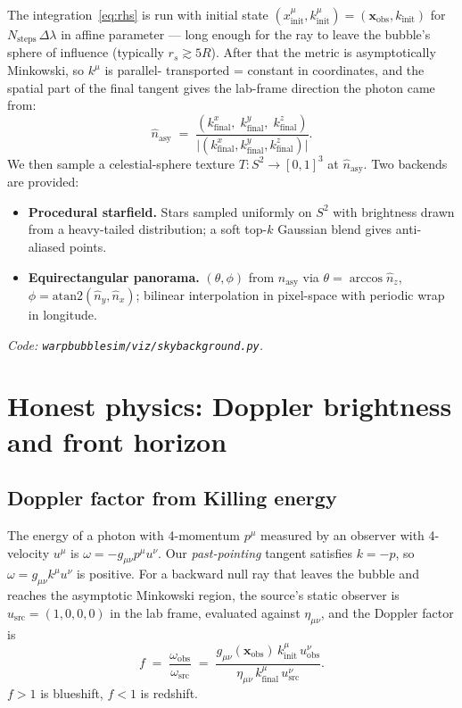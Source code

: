 \documentclass[11pt]{article}
\begin{document}
The integration~\eqref{eq:rhs} is run with initial state
$(x^\mu_{\text{init}}, k^\mu_{\text{init}}) = (\bm x_{\text{obs}}, k_{\text{init}})$ for
$N_{\text{steps}}\,\Delta\lambda$ in affine parameter — long enough for the
ray to leave the bubble's sphere of influence (typically $r_s \gtrsim 5R$).
After that the metric is asymptotically Minkowski, so $k^\mu$ is parallel-
transported = constant in coordinates, and the spatial part of the final
tangent gives the lab-frame direction the photon came from:
\begin{equation}
\hat n_{\text{asy}} \;=\; \frac{(k^x_{\text{final}},\;k^y_{\text{final}},\;k^z_{\text{final}})}{\bigl|(k^x_{\text{final}},k^y_{\text{final}},k^z_{\text{final}})\bigr|}.
\end{equation}
We then sample a celestial-sphere texture $T:S^2\to[0,1]^3$ at $\hat n_{\text{asy}}$.
Two backends are provided:
\begin{itemize}[leftmargin=*]
  \item \textbf{Procedural starfield.}  Stars sampled uniformly on $S^2$
        with brightness drawn from a heavy-tailed distribution; a soft
        top-$k$ Gaussian blend gives anti-aliased points.
  \item \textbf{Equirectangular panorama.}  $(\theta,\phi)$ from
        $\hat n_{\text{asy}}$ via $\theta=\arccos\hat n_z$, $\phi=\mathrm{atan2}(\hat n_y,\hat n_x)$;
        bilinear interpolation in pixel-space with periodic wrap in
        longitude.
\end{itemize}

\smallskip
\noindent\emph{Code: \texttt{warpbubblesim/viz/skybackground.py}.}

\section{Honest physics: Doppler brightness and front horizon}

\subsection{Doppler factor from Killing energy}

The energy of a photon with 4-momentum $p^\mu$ measured by an observer
with 4-velocity $u^\mu$ is $\omega = -g_{\mu\nu}p^\mu u^\nu$.  Our
\emph{past-pointing} tangent satisfies $k = -p$, so $\omega = g_{\mu\nu}k^\mu u^\nu$
is positive.  For a backward null ray that leaves the bubble and reaches
the asymptotic Minkowski region, the source's static observer is
$u_{\text{src}} = (1,0,0,0)$ in the lab frame, evaluated against
$\eta_{\mu\nu}$, and the Doppler factor is
\begin{equation}
\boxed{\quad
f \;=\; \frac{\omega_{\text{obs}}}{\omega_{\text{src}}}
   \;=\; \frac{g_{\mu\nu}(\bm x_{\text{obs}})\,k^\mu_{\text{init}}\,u^\nu_{\text{obs}}}{\eta_{\mu\nu}\,k^\mu_{\text{final}}\,u^\nu_{\text{src}}}.
\quad}
\label{eq:doppler}
\end{equation}
$f>1$ is blueshift, $f<1$ is redshift.
\end{document}
